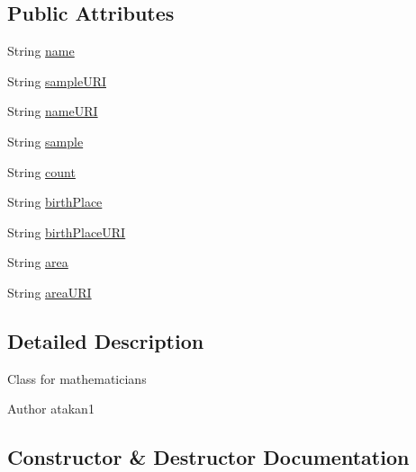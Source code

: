\subsection*{Public Attributes}
\begin{DoxyCompactItemize}
\item 
String \hyperlink{classcom_1_1example_1_1servlets_1_1_atakan_servlet_1_1_mathematician_aecaff5d99b81df1d9e8e0f72b1dbb58d}{name}
\item 
String \hyperlink{classcom_1_1example_1_1servlets_1_1_atakan_servlet_1_1_mathematician_a117d588b1ebe1e50099a31ac3fa76d01}{sample\+U\+RI}
\item 
String \hyperlink{classcom_1_1example_1_1servlets_1_1_atakan_servlet_1_1_mathematician_a620593b98fb441a8e7001b3c6d58b711}{name\+U\+RI}
\item 
String \hyperlink{classcom_1_1example_1_1servlets_1_1_atakan_servlet_1_1_mathematician_ae895437cf6140abf4afb34b0495cf5bf}{sample}
\item 
String \hyperlink{classcom_1_1example_1_1servlets_1_1_atakan_servlet_1_1_mathematician_a448984baceec15920e764d7415986ba9}{count}
\item 
String \hyperlink{classcom_1_1example_1_1servlets_1_1_atakan_servlet_1_1_mathematician_a7cd962c07d10aa8863792e3c96f8535e}{birth\+Place}
\item 
String \hyperlink{classcom_1_1example_1_1servlets_1_1_atakan_servlet_1_1_mathematician_aba43184af90f2a158cb8c46e749c4b40}{birth\+Place\+U\+RI}
\item 
String \hyperlink{classcom_1_1example_1_1servlets_1_1_atakan_servlet_1_1_mathematician_af461f1e047696a1ef9a2ff3b8da73b90}{area}
\item 
String \hyperlink{classcom_1_1example_1_1servlets_1_1_atakan_servlet_1_1_mathematician_ae9dbef6ce6fe9d278948f8549b1ee392}{area\+U\+RI}
\end{DoxyCompactItemize}


\subsection{Detailed Description}
Class for mathematicians

\begin{DoxyAuthor}{Author}
atakan1 
\end{DoxyAuthor}


\subsection{Constructor \& Destructor Documentation}
